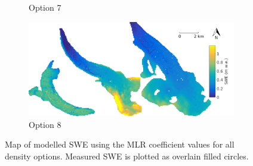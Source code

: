 \documentclass[12pt]{article}
\begin{document}
\begin{figure}
\begin{subfigure}[b]{0.475\textwidth}
            \caption[]%
            {{\small Option 7}}    
        \end{subfigure}
        \quad
        \begin{subfigure}[b]{0.475\textwidth}   
            \centering 
            \includegraphics[width=\textwidth]{MLRmap_Modelled_Observed_Opt8.png}
            \caption[]%
            {{\small Option 8}}    
        \end{subfigure}
        
        \caption[Map of modelled SWE using the MLR coefficient values for all density options. Measured SWE is plotted as overlain filled circles.]
        {\small Map of modelled SWE using the MLR coefficient values for all density options. Measured SWE is plotted as overlain filled circles.} 
        \label{fig:allMLRmodelled}
    \end{figure}
    
\end{document}
